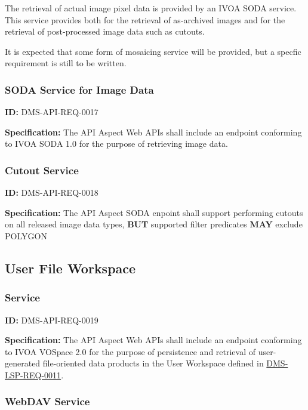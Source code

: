 \documentclass[SE,toc,lsstdraft]{lsstdoc}
\begin{document}
The retrieval of actual image pixel data is provided by an IVOA SODA service.  This service provides both for the retrieval of as-archived images and for the retrieval of post-processed image data such as cutouts.

It is expected that some form of mosaicing service will be provided, but a specfic requirement is still to be written.

\subsubsection{SODA Service for Image Data}

\label{DMS-API-REQ-0017}
\textbf{ID:} DMS-API-REQ-0017

\textbf{Specification:}
The API Aspect Web APIs shall include an endpoint conforming to IVOA SODA 1.0 for the purpose of retrieving image data.

\subsubsection{Cutout Service}

\label{DMS-API-REQ-0018}
\textbf{ID:} DMS-API-REQ-0018

\textbf{Specification:}
The API Aspect SODA enpoint shall support performing cutouts on all released image data types, \textbf{BUT} supported filter predicates \textbf{MAY} exclude POLYGON

\subsection{User File Workspace}

\subsubsection{Service}

\label{DMS-API-REQ-0019}
\textbf{ID:} DMS-API-REQ-0019

\textbf{Specification:}
The API Aspect Web APIs shall include an endpoint conforming to IVOA VOSpace 2.0 for the purpose of persistence and retrieval of user-generated file-oriented data products in the User Workspace defined in \hyperref[DMS-LSP-REQ-0011]{DMS-LSP-REQ-0011}.

\subsubsection{WebDAV Service}
\end{document}
